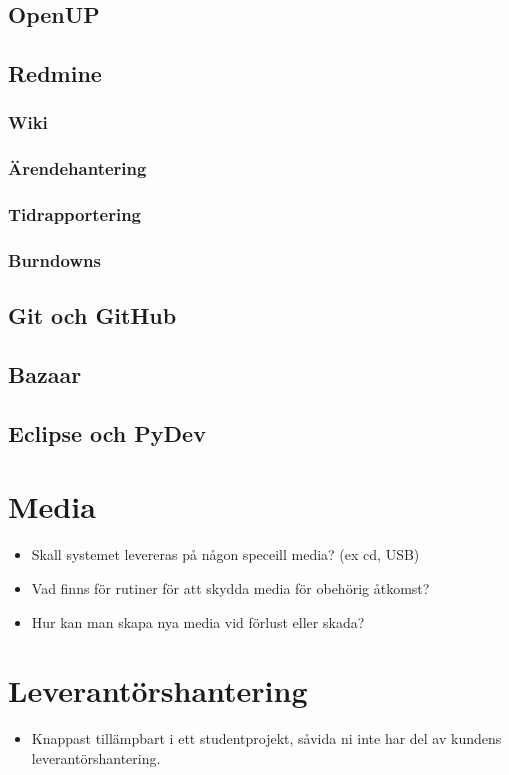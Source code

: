 \subsection{OpenUP}
\subsection{Redmine}
\subsubsection{Wiki}
\subsubsection{Ärendehantering}
\subsubsection{Tidrapportering}
\subsubsection{Burndowns}
\subsection{Git och GitHub}
\subsection{Bazaar}
\subsection{Eclipse och PyDev}

\section{Media}
\begin{itemize}
\item Skall systemet levereras på någon speceill media? (ex cd, USB)
\item Vad finns för rutiner för att skydda media  för obehörig åtkomst?
\item Hur kan man skapa nya media vid förlust eller skada?
\end{itemize}

\section{Leverantörshantering}
\begin{itemize}
\item Knappast tillämpbart i ett studentprojekt, såvida ni inte har del av kundens leverantörshantering.
\end{itemize}


